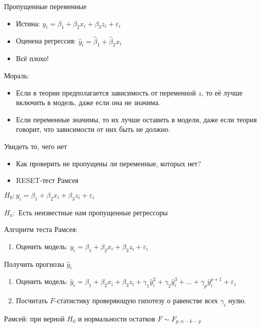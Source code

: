 \documentclass[ignorenonframetext,]{beamer}
\begin{document}
\begin{frame}{Пропущенные переменные}

\begin{itemize}
\item
  Истина: $y_i = \beta_1 + \beta_2 x_i + \beta_3 z_i +\varepsilon_i$
\item
  Оценена регрессия: $\hat{y}_i=\hat{\beta}_1 + \hat{\beta}_2 x_i$
\item
  Всё плохо!
\end{itemize}

\end{frame}

\begin{frame}{Мораль:}

\begin{itemize}
\item
  Если в теории предполагается зависимость от переменной $z$, то её
  лучше включить в модель, даже если она не значима.
\item
  Если переменные значимы, то их лучше оставить в модели, даже если
  теория говорит, что зависимости от них быть не должно.
\end{itemize}

\end{frame}

\begin{frame}{Увидеть то, чего нет}

\begin{itemize}
\item
  Как проверить не пропущены ли переменные, которых нет?
\item
  RESET-тест Рамсея
\end{itemize}

$H_0: y_i = \beta_1 + \beta_2 x_i + \beta_3 z_i + \varepsilon_i$

$H_a:$ Есть неизвестные нам пропущенные регрессоры

\end{frame}

\begin{frame}{Алгоритм теста Рамсея:}

\begin{enumerate}
\def\labelenumi{\arabic{enumi}.}
\itemsep1pt\parskip0pt
\item
  Оценить модель:
  $y_i = \beta_1 + \beta_2 x_i + \beta_3 z_i + \varepsilon_i$
\end{enumerate}

Получить прогнозы $\hat{y}_i$

\begin{enumerate}
\def\labelenumi{\arabic{enumi}.}
\setcounter{enumi}{1}
\item
  Оценить модель:
  $\hat{y}_i = \beta_1 + \beta_2 x_i + \beta_3 z_i + \gamma_1 \hat{y}^2_i + \gamma_2 \hat{y}^3_i + ... + \gamma_p \hat{y}_i^{p+1} + \varepsilon_i$
\item
  Посчитать $F$-статистику проверяющую гипотезу о равенстве всех
  $\gamma_i$ нулю.
\end{enumerate}

Рамсей: при верной $H_0$ и нормальности остатков $F\sim F_{p,n-k-p}$

\end{frame}
\end{document}

